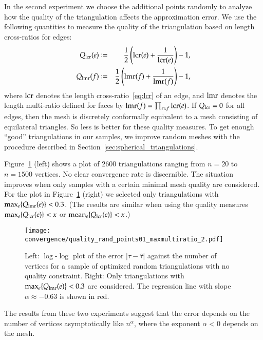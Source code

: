 \documentclass[Thesis]{subfiles}
\begin{document}

In the second experiment we choose the additional points randomly to
analyze how the quality of the triangulation affects the approximation
error. We use the following quantities to measure the quality of the
triangulation based on length cross-ratios for edges:
\begin{eqnarray*}
	Q_{\operatorname{lcr}}(e) &\vcentcolon=& \frac{1}{2}\left(\operatorname{lcr}(e) + \frac{1}{\operatorname{lcr}(e)}\right) - 1\label{eq:quality_lcr},\\
	Q_{\operatorname{lmr}}(f) &\vcentcolon=& \frac{1}{2}\left(\operatorname{lmr}(f) + \frac{1}{\operatorname{lmr}(f)}\right) - 1\label{eq:quality_lmr},
\end{eqnarray*}
where $\operatorname{lcr}$ denotes the length cross-ratio~\eqref{eq:lcr} of an edge,
and $\operatorname{lmr}$ denotes the length multi-ratio defined for faces by
$\operatorname{lmr}(f)=\prod_{e \in f}\operatorname{lcr}(e)$. If $Q_{\operatorname{lcr}}=0$ for all edges, then
the mesh is discretely conformally equivalent to a mesh consisting of
equilateral triangles. So less is better for these quality
measures. To get enough ``good'' triangulations in our samples, we
improve random meshes with the procedure described in
Section~\ref{sec:spherical_triangulations}.

Figure~\ref{fig:convergence_quality} (left) shows a plot of $2600$
triangulations ranging from $n=20$ to $n=1500$ vertices. No clear
convergence rate is discernible. The situation improves when only
samples with a certain minimal mesh quality are considered.  For the
plot in Figure~\ref{fig:convergence_quality} (right) we selected only
triangulations with $\max_e \{Q_{\operatorname{lmr}}(e)\} < 0.3$. (The results
are similar when using the quality measures $\max_e \{Q_{\operatorname{lcr}}(e)\} <
x$ or $\operatorname{mean}_e \{Q_{\operatorname{lcr}}(e)\} < x$.)

\begin{figure}
\centering
\texttt{[image: convergence/quality\_rand\_points01\_maxmultiratio\_2.pdf]}
\caption{Left: $\log$-$\log$ plot of the error $|\tau - \hat\tau|$
  against the number of vertices for a sample of optimized random
  triangulations with no quality constraint. Right: Only
  triangulations with $\max_e \{Q_{\operatorname{lmr}}(e)\} < 0.3$ are
  considered. The regression line with slope $\alpha\approx -0.63$ is
  shown in red.}
\label{fig:convergence_quality}
\end{figure}

The results from these two experiments suggest that the error depends
on the number of vertices asymptotically like $n^{\alpha}$,
where the exponent $\alpha<0$ depends on the mesh. 
\end{document}
